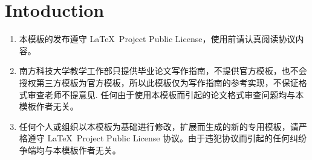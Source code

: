 \section{Intoduction}
\begin{enumerate}[label={\alph*)}]
    \item 本模板的发布遵守 \LaTeX\ Project Public License，使用前请认真阅读协议内容。
    \item 南方科技大学教学工作部只提供毕业论文写作指南，不提供官方模板，也不会授权第三方模板为官方模板，所以此模板仅为写作指南的参考实现，不保证格式审查老师不提意见. 任何由于使用本模板而引起的论文格式审查问题均与本模板作者无关。
    \item 任何个人或组织以本模板为基础进行修改，扩展而生成的新的专用模板，请严格遵守 \LaTeX\ Project Public License 协议。由于违犯协议而引起的任何纠纷争端均与本模板作者无关。
\end{enumerate}
